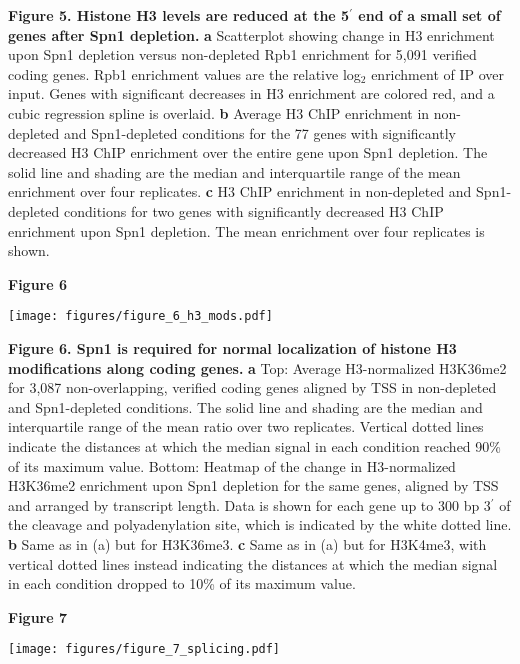 \documentclass[8pt]{extarticle}
\begin{document}
\vspace{2em}
\textbf{Figure 5. Histone H3 levels are reduced at the 5$^\prime$ end of a small set of genes after Spn1 depletion.}
\textbf{a} Scatterplot showing change in H3 enrichment upon Spn1 depletion versus non-depleted Rpb1 enrichment for 5,091 verified coding genes.
Rpb1 enrichment values are the relative log$_2$ enrichment of IP over input.
Genes with significant decreases in H3 enrichment are colored red, and a cubic regression spline is overlaid.
\textbf{b} Average H3 ChIP enrichment in non-depleted and Spn1-depleted conditions for the 77 genes with significantly decreased H3 ChIP enrichment over the entire gene upon Spn1 depletion.
The solid line and shading are the median and interquartile range of the mean enrichment over four replicates.
\textbf{c} H3 ChIP enrichment in non-depleted and Spn1-depleted conditions for two genes with significantly decreased H3 ChIP enrichment upon Spn1 depletion.
The mean enrichment over four replicates is shown.

\newpage

\textbf{\large Figure 6}

\vspace{5.5pt}
\texttt{[image: figures/figure\_6\_h3\_mods.pdf]}

\vspace{2em}
\textbf{Figure 6. Spn1 is required for normal localization of histone H3 modifications along coding genes.}
\textbf{a} Top: Average H3-normalized H3K36me2 for 3,087 non-overlapping, verified coding genes aligned by TSS in non-depleted and Spn1-depleted conditions.
The solid line and shading are the median and interquartile range of the mean ratio over two replicates.
Vertical dotted lines indicate the distances at which the median signal in each condition reached 90\% of its maximum value.
Bottom: Heatmap of the change in H3-normalized H3K36me2 enrichment upon Spn1 depletion for the same genes, aligned by TSS and arranged by transcript length.
Data is shown for each gene up to 300 bp 3$^\prime$ of the cleavage and polyadenylation site, which is indicated by the white dotted line.
\textbf{b} Same as in (a) but for H3K36me3.
\textbf{c} Same as in (a) but for H3K4me3, with vertical dotted lines instead indicating the distances at which the median signal in each condition dropped to 10\% of its maximum value.

\newpage

\textbf{\large Figure 7}

\texttt{[image: figures/figure\_7\_splicing.pdf]}
\end{document}
